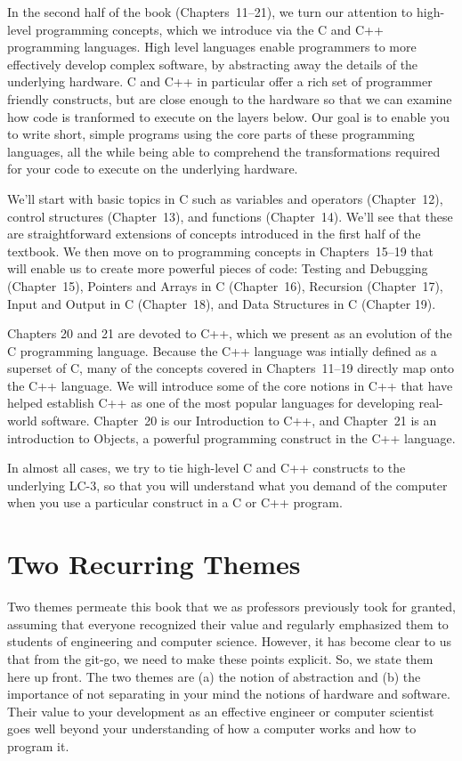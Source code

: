 \documentclass{patt}
\begin{document}
In the second half of the book (Chapters~11--21), we turn our attention to 
high-level programming concepts, which we introduce via the C and C++ 
programming languages.  High level languages enable programmers to more 
effectively develop complex software, by abstracting away the details of the 
underlying hardware.  C and C++ in particular offer a rich set of programmer 
friendly constructs, but are close enough to the hardware so that we can 
examine how code is tranformed to execute on the layers below.  
Our goal is to enable you to write short, simple programs using the core 
parts of these programming languages, all the while being able to comprehend
the transformations required for your code to execute on the underlying 
hardware.

We'll start with basic topics in C such as variables and operators 
(Chapter~12), control structures (Chapter~13), and functions (Chapter~14).  
We'll see that these are straightforward extensions of concepts introduced 
in the first half of the textbook.  We then move on to programming concepts 
in Chapters~15--19 that will enable us to create more powerful pieces of 
code: Testing and Debugging (Chapter~15), Pointers and Arrays in C
(Chapter~16), Recursion (Chapter~17), Input and Output in C (Chapter~18), and
Data Structures in C (Chapter 19).

Chapters 20 and 21 are devoted to C++, which we present as an evolution of 
the C programming language.   Because the C++ language was intially defined 
as a superset of C, many of the concepts covered in Chapters~11--19 directly 
map onto the C++ language.  We will introduce some of the core notions in 
C++ that have helped establish C++ as one of the most popular languages for 
developing real-world software.  Chapter~20 is our Introduction to C++,  
and Chapter~21 is an introduction to Objects, a powerful programming 
construct in the C++ language.

In almost all cases, we try to tie
high-level C and C++ constructs to the underlying LC-3, so that you
will understand what you demand of the computer when you use
a particular construct in a C or C++ program.

\vspace{-16pt}
\section{Two Recurring Themes}

Two themes permeate this book that we as professors previously
took for granted, assuming that everyone recognized their value and
regularly emphasized them to students of engineering and
computer science.  However, it has become clear to us that from the git-go,
we need to make these points explicit.  So, we state
them here up front.  The two themes are (a) the notion of abstraction
and (b) the importance of not separating in your mind the notions of
hardware and software.  Their value to your development as an effective
engineer or computer scientist goes well beyond your understanding of
how a computer works and how to program it.
\end{document}
